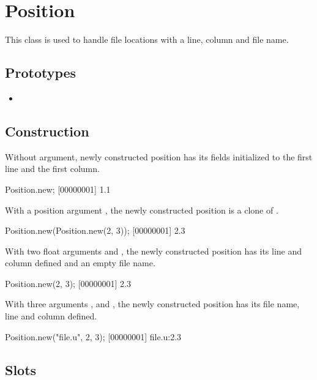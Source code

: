 \section{Position}

This class is used to handle file locations with a line, column and file
name.

\subsection{Prototypes}
\begin{itemize}
\item {}
\end{itemize}

\subsection{Construction}

Without argument, newly constructed position has its fields initialized to
the first line and the first column.

\begin{urbiscript}
Position.new;
[00000001] 1.1
\end{urbiscript}

With a position argument , the newly constructed position is a clone
of .

\begin{urbiscript}
Position.new(Position.new(2, 3));
[00000001] 2.3
\end{urbiscript}

With two float arguments  and , the newly constructed position
has its line and column defined and an empty file name.

\begin{urbiscript}
Position.new(2, 3);
[00000001] 2.3
\end{urbiscript}

With three arguments ,  and , the newly constructed position
has its file name, line and column defined.

\begin{urbiscript}
Position.new("file.u", 2, 3);
[00000001] file.u:2.3
\end{urbiscript}

\subsection{Slots}


